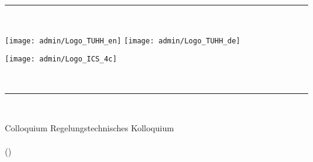 
\thispagestyle{empty}
\newcommand{\HRule}{\textcolor{darkBlue}{\rule{\textwidth}{0.4mm}}} 

{
	{
	{}}
}

\HRule \\[0.4cm]
\begin{minipage}{0.4\textwidth}
\begin{flushleft} \large
{}
{\texttt{[image: admin/Logo\_TUHH\_en]}}
{\texttt{[image: admin/Logo\_TUHH\_de]}}
\end{flushleft}
\end{minipage}
\hfill
\begin{minipage}{0.4\textwidth}
\begin{flushright} \large
\texttt{[image: admin/Logo\_ICS\_4c]} %
\end{flushright}
\end{minipage}\\[0.4cm]
\HRule \\


\begin{center}{\huge 
	{Colloquium}
	{Regelungstechnisches Kolloquium}
	}\\[1cm]
	{\large\textit{ \authorfirstname \;\authorfamilyname}}\\[0.25cm]
	(\whereFrom)\\[0.25cm]
	 \\
	\\[1cm]
	\begingroup
	\renewcommand*\baselinestretch{1.5}%
	\makeatletter\@currsize\makeatother%
	 \\[1cm]
	\endgroup
\end{center}

